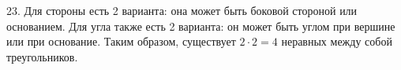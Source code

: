 23. Для стороны есть 2 варианта: она может быть боковой стороной или основанием. Для угла также есть 2 варианта: он может быть углом при вершине или при основание. Таким образом, существует $2\cdot2=4$ неравных между собой треугольников.\\
